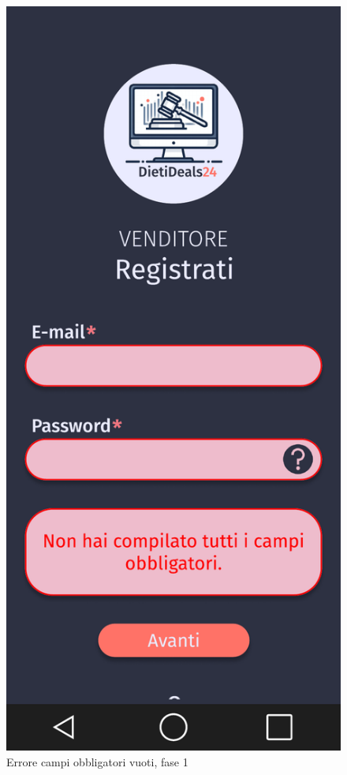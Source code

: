 \begin{figure}[!htb]
\begin{minipage}{0.32\textwidth}
            \includegraphics[width=.7\linewidth]{Immagini/Frames/Errori/E5.pdf}
            \caption{Errore campi obbligatori vuoti, fase 1}
        \end{minipage}\hfill
        \begin{minipage}{0.32\textwidth}
            \centering

\end{minipage}
\end{figure}
